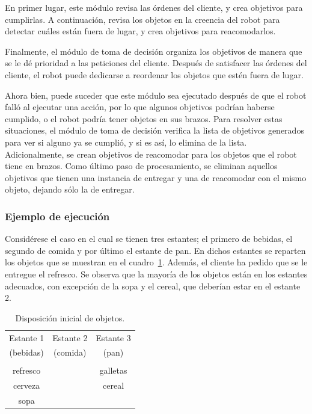 \documentclass[11pt]{article}
\begin{document}
En primer lugar, este módulo revisa las órdenes del cliente, y crea objetivos para cumplirlas. A continuación, revisa los objetos en la creencia del robot para detectar cuáles están fuera de lugar, y crea objetivos para reacomodarlos.

Finalmente, el módulo de toma de decisión organiza los objetivos de manera que se le dé prioridad a las peticiones del cliente. Después de satisfacer las órdenes del cliente, el robot puede dedicarse a reordenar los objetos que estén fuera de lugar.

Ahora bien, puede suceder que este módulo sea ejecutado después de que el robot falló al ejecutar una acción, por lo que algunos objetivos podrían haberse cumplido, o el robot podría tener objetos en sus brazos. Para resolver estas situaciones, el módulo de toma de decisión verifica la lista de objetivos generados para ver si alguno ya se cumplió, y si es así, lo elimina de la lista. Adicionalmente, se crean objetivos de reacomodar para los objetos que el robot tiene en brazos. Como último paso de procesamiento, se eliminan aquellos objetivos que tienen una instancia de entregar y una de reacomodar con el mismo objeto, dejando sólo la de entregar.

\subsubsection{Ejemplo de ejecución}

Considérese el caso en el cual se tienen tres estantes; el primero de bebidas, el segundo de comida y por último el estante de pan. En dichos estantes se reparten los objetos que se muestran en el cuadro~\ref{tab:EjemploDecision}. Además, el cliente ha pedido que se le entregue el refresco. Se observa que la mayoría de los objetos están en los estantes adecuados, con excepción de la sopa y el cereal, que deberían estar en el estante 2.

\begin{table}
    \centering
    \caption{Disposición inicial de objetos.}
    \label{tab:EjemploDecision}
    \begin{tabular}{c | c | c}
        Estante 1 & Estante 2 & Estante 3 \\
        (bebidas) & (comida) & (pan) \\
        \hline \\
        refresco & & galletas \\
        cerveza & & cereal \\
        sopa & &
    \end{tabular}
\end{table}
\end{document}
